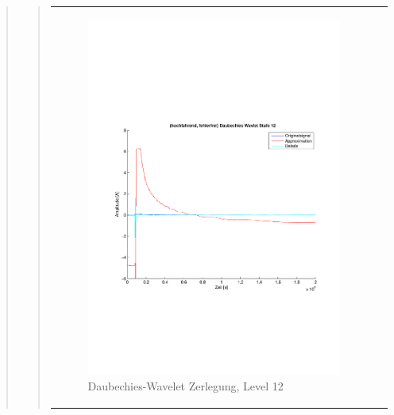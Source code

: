 \begin{quote}
\begin{quote}
\begin{center}
\begin{tabular}{ll}
\begin{minipage}{0.6\textwidth}
                    \end{minipage}
                    \begin{minipage}{0.6\textwidth}
    
                        \begin{figure}[H]
                            \label{fig:}
                            \includegraphics[scale=0.4, trim = 2cm 6cm 1cm
                            7.5cm,
                            clip]{./Bilder/Termin8/fehlerfrei_hochlaufen_Daubechies_Wavlet_lvl_12}
                            \caption{Daubechies-Wavelet Zerlegung, Level 12}
                        \end{figure}
                    \vspace{-1.5em}
    
                    \end{minipage}
    

\end{tabular}
\end{center}
\end{quote}
\end{quote}
